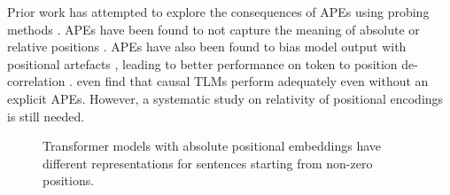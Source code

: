 \documentclass[letterpaper, 12pt]{report}
\begin{document}
Prior work has attempted to explore the consequences of APEs using probing methods \citep{wang2021on}.
APEs have been found to not capture the meaning of absolute or relative positions \citep{wang-chen-2020-position}.
APEs have also been found to bias model output with positional artefacts \citep{luo-etal-2021-positional}, leading to better performance on token to position de-correlation \citep{ke2021}.
\citet{haviv2022} even find that causal TLMs perform adequately even without an explicit APEs.
However, a systematic study on relativity of positional encodings is still needed.

\begin{figure}
    \centering
    \caption{Transformer models with absolute positional embeddings have different representations for sentences starting from non-zero positions. }
    \label{fig:bert_confused}
\end{figure}
\end{document}
